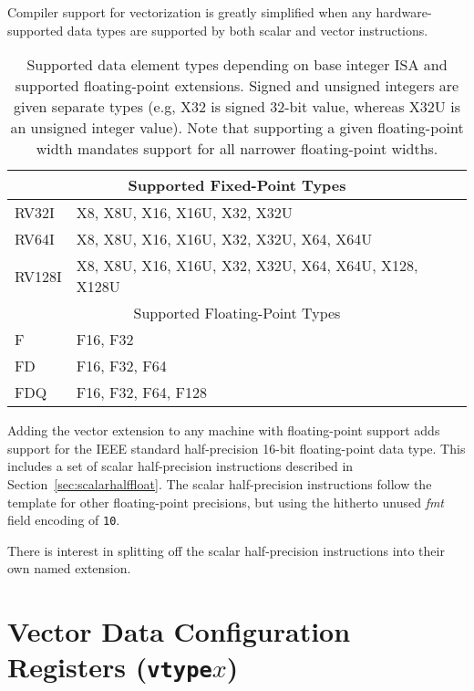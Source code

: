 \begin{commentary}
  Compiler support for vectorization is greatly simplified when any
  hardware-supported data types are supported by both scalar and
  vector instructions.
\end{commentary}

\begin{table}
  \centering
\begin{tabular}{|l|l|}
  \hline
  \multicolumn{2}{|c|}{Supported Fixed-Point Types} \\
  \hline
  RV32I  & X8, X8U, X16, X16U, X32, X32U \\
  RV64I  & X8, X8U, X16, X16U, X32, X32U, X64, X64U \\
  RV128I & X8, X8U, X16, X16U, X32, X32U, X64, X64U, X128, X128U \\
  \hline
  \hline
  \multicolumn{2}{|c|}{Supported Floating-Point Types} \\
  \hline
  F      & F16, F32 \\
  FD     & F16, F32, F64 \\
  FDQ    & F16, F32, F64, F128 \\
  \hline
\end{tabular}
\caption{Supported data element types depending on base integer ISA
  and supported floating-point extensions.  Signed and unsigned
  integers are given separate types (e.g, X32 is signed 32-bit value,
  whereas X32U is an unsigned integer value). Note that supporting a
  given floating-point width mandates support for all narrower
  floating-point widths.}
\label{tab:velemtypes}
\end{table}

Adding the vector extension to any machine with floating-point support
adds support for the IEEE standard half-precision 16-bit
floating-point data type.  This includes a set of scalar
half-precision instructions described in
Section~\ref{sec:scalarhalffloat}.  The scalar half-precision
instructions follow the template for other floating-point precisions,
but using the hitherto unused {\em fmt} field encoding of {\tt 10}.

\begin{commentary}
  There is interest in splitting off the scalar half-precision
  instructions into their own named extension.
\end{commentary}

\section{Vector Data Configuration Registers ({\tt vtype}$x$)}

